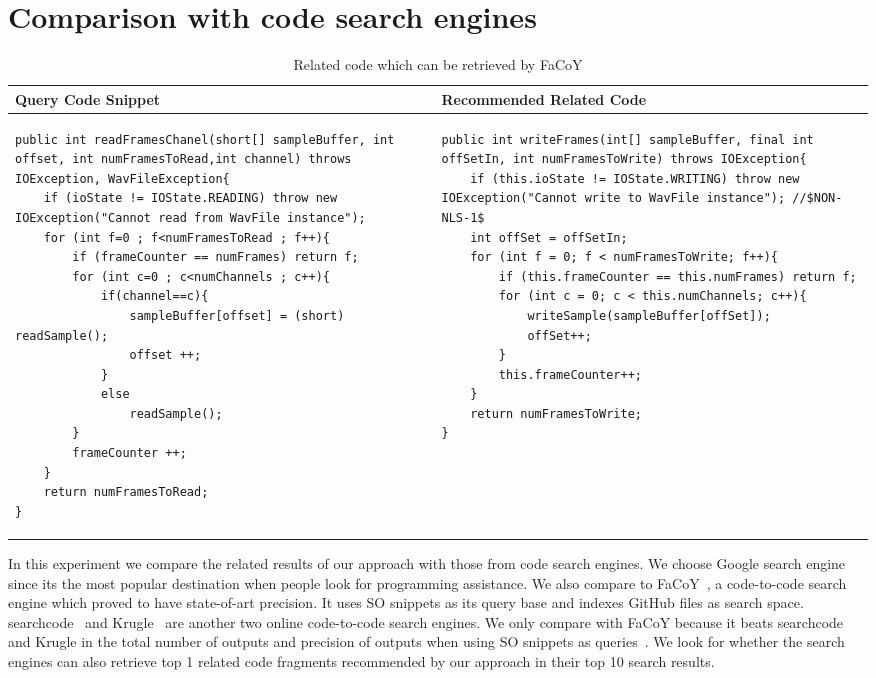 \section{Comparison with code search engines}


\lstset{
	frame=none,
	aboveskip=0pt,
	belowskip=0pt,
	basicstyle=\tiny\ttfamily,
}
\begin{table*}\scriptsize
	\caption{Related code which can be retrieved by FaCoY}
	\label{tab:facoy-example}
	
	\setlength{\tabcolsep}{0.01\textwidth}
	\begin{tabular}{@{}p{}p{}@{}}
		\toprule
		Query Code Snippet & Recommended Related Code \\
		\midrule


\begin{lstlisting}
public int readFramesChanel(short[] sampleBuffer, int offset, int numFramesToRead,int channel) throws IOException, WavFileException{
	if (ioState != IOState.READING) throw new IOException("Cannot read from WavFile instance");
	for (int f=0 ; f<numFramesToRead ; f++){
		if (frameCounter == numFrames) return f;
		for (int c=0 ; c<numChannels ; c++){
			if(channel==c){
				sampleBuffer[offset] = (short) readSample();
				offset ++;
			}
			else
				readSample();
		}
		frameCounter ++;
	}
	return numFramesToRead;
}
\end{lstlisting}
		
		&
\begin{lstlisting}
public int writeFrames(int[] sampleBuffer, final int offSetIn, int numFramesToWrite) throws IOException{
	if (this.ioState != IOState.WRITING) throw new IOException("Cannot write to WavFile instance"); //$NON-NLS-1$
	int offSet = offSetIn;
	for (int f = 0; f < numFramesToWrite; f++){
		if (this.frameCounter == this.numFrames) return f;
		for (int c = 0; c < this.numChannels; c++){
			writeSample(sampleBuffer[offSet]);
			offSet++;
		}
		this.frameCounter++;
	}
	return numFramesToWrite;
}
		
\end{lstlisting}
\\

\bottomrule
	\end{tabular}
\end{table*}
		

In this experiment we compare the related results of our approach with those from code search engines. We choose Google search engine since its the most popular destination when people look for programming assistance. We also compare to {\ttt FaCoY}~\cite{kim2018Facoy}, a code-to-code search engine which proved to have state-of-art precision. It uses SO snippets as its query base and indexes GitHub files as search space. {\ttt searchcode}~\cite{searchcode} and {\ttt Krugle}~\cite{krugle} are another two online code-to-code search engines. We only compare with {\ttt FaCoY} because it beats {\ttt searchcode} and {\ttt Krugle} in the total number of outputs and precision of outputs when using SO snippets as queries~\cite{kim2018Facoy}. 
We look for whether the search engines can also retrieve top 1 related code fragments recommended by our approach in their top 10 search results. 

